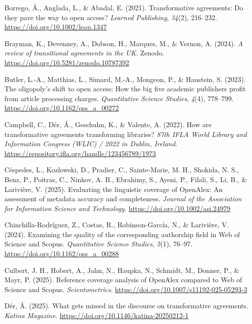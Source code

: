 \documentclass[a4paper,man,floatsintext,longtable,noextraspace,10pt]{apa6}
\newlength{\cslhangindent}
\newenvironment{CSLReferences}[2] %
{\begin{list}{}{%
  \setlength{\itemindent}{0pt}
  \setlength{\leftmargin}{0pt}
  \setlength{\parsep}{0pt}
  \ifodd #1
  \setlength{\leftmargin}{\cslhangindent}
  \setlength{\itemindent}{-1\cslhangindent}
  \fi
  \setlength{\itemsep}{#2\baselineskip}}}
{\end{list}}
\begin{document}
\begin{CSLReferences}{1}{0}
Borrego, Á., Anglada, L., \& Abadal, E. (2021). Transformative
agreements: Do they pave the way to open access? \emph{Learned
Publishing}, \emph{34}(2), 216--232.
\url{https://doi.org/10.1002/leap.1347}

Brayman, K., Devenney, A., Dobson, H., Marques, M., \& Vernon, A.
(2024). \emph{A review of transitional agreements in the {UK}}. Zenodo.
\url{https://doi.org/10.5281/zenodo.10787392}

Butler, L.-A., Matthias, L., Simard, M.-A., Mongeon, P., \& Haustein, S.
(2023). The oligopoly's shift to open access: How the big five academic
publishers profit from article processing charges. \emph{Quantitative
Science Studies}, \emph{4}(4), 778--799.
\url{https://doi.org/10.1162/qss_a_00272}

Campbell, C., Dér, Á., Geschuhn, K., \& Valente, A. (2022). How are
transformative agreements transforming libraries? \emph{87th IFLA World
Library and Information Congress (WLIC) / 2022 in Dublin, Ireland}.
\url{https://repository.ifla.org/handle/123456789/1973}

Céspedes, L., Kozlowski, D., Pradier, C., Sainte‐Marie, M. H., Shokida,
N. S., Benz, P., Poitras, C., Ninkov, A. B., Ebrahimy, S., Ayeni, P.,
Filali, S., Li, B., \& Larivière, V. (2025). Evaluating the linguistic
coverage of {OpenAlex}: An assessment of metadata accuracy and
completeness. \emph{Journal of the Association for Information Science
and Technology}. \url{https://doi.org/10.1002/asi.24979}

Chinchilla-Rodríguez, Z., Costas, R., Robinson-García, N., \& Larivière,
V. (2024). Examining the quality of the corresponding authorship field
in {Web of Science} and {Scopus}. \emph{Quantitative Science Studies},
\emph{5}(1), 76--97. \url{https://doi.org/10.1162/qss_a_00288}

Culbert, J. H., Hobert, A., Jahn, N., Haupka, N., Schmidt, M., Donner,
P., \& Mayr, P. (2025). Reference coverage analysis of {OpenAlex}
compared to {Web of Science} and {Scopus}. \emph{Scientometrics}.
\url{https://doi.org/10.1007/s11192-025-05293-3}

Dér, Á. (2025). What gets missed in the discourse on transformative
agreements. \emph{Katina Magazine}.
\url{https://doi.org/10.1146/katina-20250212-1}


\end{CSLReferences}
\end{document}
